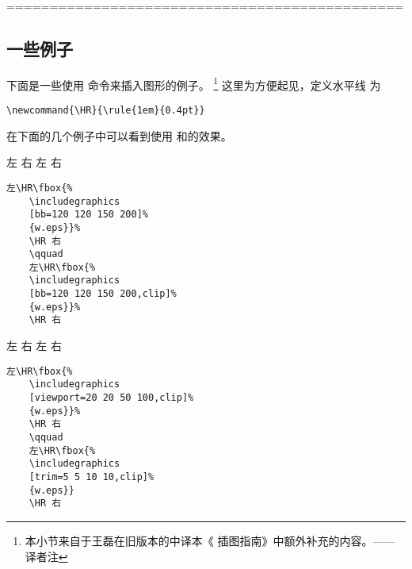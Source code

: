 ==============================================

\subsection{一些例子}

下面是一些使用  命令来插入图形的例子。
\footnote{
	本小节来自于王磊在旧版本的中译本《\LaTeXe{} 插图指南》中额外补充的内容。——译者注}
这里为方便起见，定义水平线  为
\begin{lstlisting}
\newcommand{\HR}{\rule{1em}{0.4pt}}
\end{lstlisting}

\ifpdf\else %
在下面的几个例子中可以看到使用 和的效果。

\hspace{-1cm}\begin{minipage}[c]{.5\textwidth}
	左\HR%
	\HR 右
	\qquad
	左\HR%
	\HR 右
\end{minipage}%
\begin{minipage}[c]{.5\textwidth}
	\begin{Verbatim}[frame=lines,label=\colorbox{green}{\small 例一},labelposition=topline,]
	左\HR\fbox{%
	\includegraphics
	[bb=120 120 150 200]%
	{w.eps}}%
	\HR 右
	\qquad
	左\HR\fbox{%
	\includegraphics
	[bb=120 120 150 200,clip]%
	{w.eps}}%
	\HR 右
	\end{Verbatim}
\end{minipage}

\hspace{-1.5cm}\begin{minipage}[c]{.65\textwidth}
	左\HR\fbox{%
		\texttt{[image: w]}}%
	\HR 右
	\qquad
	左\HR\fbox{%
		\texttt{[image: w]}}%
	\HR 右
\end{minipage}%
\hspace{-1cm}\begin{minipage}[c]{.5\textwidth}
	\begin{Verbatim}[frame=lines,label=\colorbox{green}{\small 例二},labelposition=topline]
	左\HR\fbox{%
	\includegraphics
	[viewport=20 20 50 100,clip]%
	{w.eps}}%
	\HR 右
	\qquad
	左\HR\fbox{%
	\includegraphics
	[trim=5 5 10 10,clip]%
	{w.eps}}
	\HR 右
	\end{Verbatim}
	\par\vspace{0pt}
\end{minipage}
\fi

